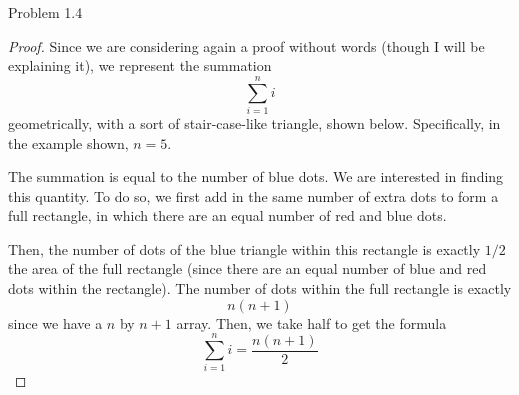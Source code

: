 \begin{sol}{Problem 1.4}
\begin{proof}
Since we are considering again a proof without words (though I will be explaining it), we represent the summation 
\[
\sum_{i=1}^{n} i
\]
geometrically, with a sort of stair-case-like triangle, shown below. Specifically, in the example shown, $n=5$.
\begin{center}
\end{center}

The summation is equal to the number of blue dots. We are interested in finding this quantity. To do so, we first add in the same number of extra dots to form a full rectangle, in which there are an equal number of red and blue dots.

\begin{center}
\end{center}
Then, the number of dots of the blue triangle within this rectangle is exactly $1/2$ the area of the full rectangle (since there are an equal number of blue and red dots within the rectangle). The number of dots within the full rectangle is exactly
\[
n (n+1)
\]
since we have a $n$ by $n+1$ array. Then, we take half to get the formula
\[
\sum_{i=1}^{n}i = \frac{n(n+1)}{2}
\] 
\end{proof}


\end{sol}
